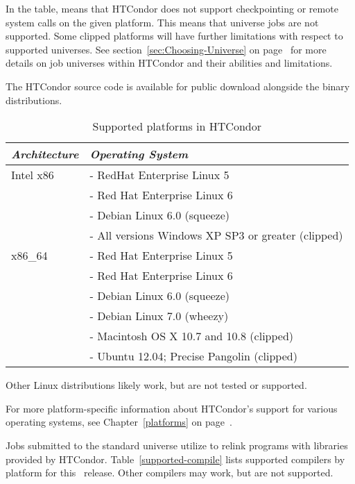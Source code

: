 In the table,  means that HTCondor does not support
checkpointing or remote system calls on the given platform. 
This means that  universe jobs are not supported.
Some clipped platforms will have further limitations with respect
to supported universes.
See section~\ref{sec:Choosing-Universe} on
page~\pageref{sec:Choosing-Universe} for more details on job universes
within HTCondor and their abilities and limitations.

The HTCondor source code is available for 
public download alongside the binary distributions.

\begin{center}
\begin{table}[hbt]
\begin{tabular}{|p{6cm}p{7cm}|} \hline
\emph{Architecture} & \emph{Operating System} \\ \hline \hline
Intel x86 & - RedHat Enterprise Linux 5 \\
 & - Red Hat Enterprise Linux 6 \\
 & - Debian Linux 6.0 (squeeze) \\
 & - All versions Windows XP SP3 or greater (clipped) \\
x86\_64 & - Red Hat Enterprise Linux 5 \\ 
 & - Red Hat Enterprise Linux 6 \\
 & - Debian Linux 6.0 (squeeze) \\
 & - Debian Linux 7.0 (wheezy) \\ \hline 
 & - Macintosh OS X 10.7 and 10.8 (clipped) \\ \hline
 & - Ubuntu 12.04; Precise Pangolin (clipped) \\ \hline
\end{tabular}
\caption{\label{table:supported-platforms}Supported platforms in HTCondor \VersionNotice}
\end{table}
\end{center}


\Note Other Linux distributions likely work, but are not tested
or supported.

For more platform-specific information about HTCondor's support for
various operating systems, see Chapter~\ref{platforms} on
page~\pageref{platforms}. 



Jobs submitted to the standard universe utilize 
to relink programs with libraries provided by HTCondor.
Table~\ref{supported-compile} lists supported compilers by
platform for this \VersionNotice\ release.
Other compilers may work, but are not supported.

